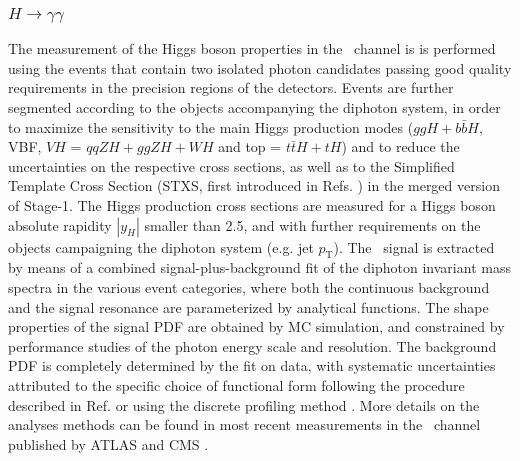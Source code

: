 \subsubsection{$H \to \gamma\gamma$}
\label{sec:Hgammagamma}

The measurement of the Higgs boson properties in the \Hyy\ channel is is performed using the events that contain two isolated photon candidates passing good quality requirements in the precision regions of the detectors. Events are further segmented according to the objects accompanying the diphoton system, in order to maximize the sensitivity to the main Higgs production modes ($ggH+b\bar{b}H$, VBF, $VH$ = $qqZH+ggZH+WH$ and top = $t\bar{t}H+tH$) and to reduce the uncertainties on the respective cross sections, as well as to the Simplified Template Cross Section (STXS, first introduced in Refs. \cite{deFlorian:2016spz,Badger:2016bpw}) in the merged version of Stage-1.
The Higgs production cross sections are measured for a Higgs boson absolute rapidity $|y_H|$ smaller than 2.5, and with further requirements on the objects campaigning the diphoton system (e.g. jet $p_\mathrm{T}$).
The \Hyy\ signal is extracted by means of a combined signal-plus-background fit of the diphoton invariant mass spectra in the various event categories, where both the continuous background and the signal resonance are parameterized by analytical functions. The shape properties of the signal PDF are obtained by MC simulation, and constrained by performance studies of the photon energy scale and resolution. The background PDF is completely determined by the fit on data, with systematic uncertainties attributed to the specific choice of functional form following the procedure described in Ref. \cite{Aad:2012tfa} or using the discrete profiling method \cite{Dauncey:2014xga}. More details on the analyses methods can be found in most recent measurements in the \Hyy\ channel published by ATLAS \cite{ATLAS:2018uso} and CMS \cite{Sirunyan:2018ouh}. 

